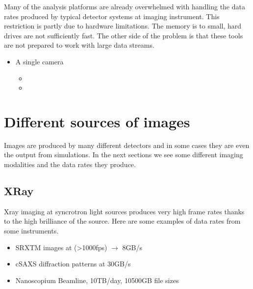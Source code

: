 \documentclass[letterpaper,10pt,english]{sphinxmanual}
\begin{document}
\sphinxAtStartPar
Many of the analysis platforms are already overwhelmed with handling the data rates produced by typical detector systems at imaging instrument. This restriction is partly due to hardware limitations. The memory is to small, hard drives are not sufficiently fast. The other side of the problem is that these tools are not prepared to work with large data streams.
\begin{itemize}
\item {} 
\sphinxAtStartPar
A single camera
\begin{itemize}
\item {} 
\sphinxAtStartPar
{}

\item {} 
\sphinxAtStartPar
{}

\end{itemize}

\end{itemize}


\section{Different sources of images}
\label{\detokenize{01-Introduction:different-sources-of-images}}
\sphinxAtStartPar
Images are produced by many different detectors and in some cases they are even the output from simulations. In the next sections we see some different imaging modalities and the data rates they produce.


\subsection{X\sphinxhyphen{}Ray}
\label{\detokenize{01-Introduction:x-ray}}
\sphinxAtStartPar
X\sphinxhyphen{}ray imaging at syncrotron light sources produces very high frame rates thanks to the high brilliance of the source. Here are some examples of data rates from some instruments.
\begin{itemize}
\item {} 
\sphinxAtStartPar
SRXTM images at (\textgreater{}1000fps) \(\rightarrow\) 8GB/s

\item {} 
\sphinxAtStartPar
cSAXS diffraction patterns at 30GB/s

\item {} 
\sphinxAtStartPar
Nanoscopium Beamline, 10TB/day, 10\sphinxhyphen{}500GB file sizes

\end{itemize}
\end{document}
